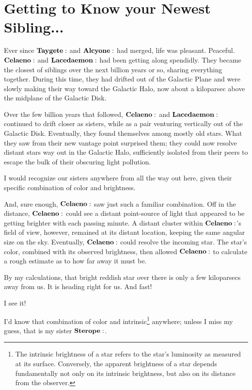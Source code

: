 \section{Getting to Know your Newest Sibling...}

Ever since $\Taygete$ and $\Alcyone$ had merged, life was pleasant.  Peaceful.  $\Celaeno$ and $\Lacedaemon$ had been getting along spendidly.  They became the closest of siblings over the next billion years or so, sharing everything together.  During this time, they had drifted out of the Galactic Plane and were slowly making their way toward the Galactic Halo, now about a kiloparsec above the midplane of the Galactic Disk. 

Over the few billion years that followed, $\Celaeno$ and $\Lacedaemon$ continued to drift closer as sisters, while as a pair venturing vertically out of the Galactic Disk.  Eventually, they found themselves among mostly old stars. What they saw from their new vantage point surprised them; they could now resolve distant stars way out in the Galactic Halo, sufficiently isolated from their peers to escape the bulk of their obscuring light pollution.  

\Celaeno I would recognize our sisters anywhere from all the way out here, given their specific combination of color and brightness.  

And, sure enough, $\Celaeno$ saw just such a familiar combination.  Off in the distance, $\Celaeno$ could see a distant point-source of light that appeared to be getting brighter with each passing minute.  A distant cluster within $\Celaeno$'s field of view, however, remained at its distant location, keeping the same angular size on the sky.  Eventually, $\Celaeno$ could resolve the incoming star.  The star's color, combined with its observed brightness, then allowed $\Celaeno$ to calculate a rough estimate as to how far away it must be.

\Celaeno  By my calculations, that bright reddish star over there is only a few kiloparsecs away from us.  It is heading right for us.  And fast!  

\Lacedaemon I see it!

\Celaeno I'd know that combination of color and intrinsic\footnote{The intrinsic brightness of a star refers to the star's luminosity as measured at its surface.  Conversely, the apparent brightness of a star depends fundamentally not only on its intrinsic brightness, but also on its distance from the observer.} anywhere; unless I miss my guess, that is my sister $\Sterope$.  

